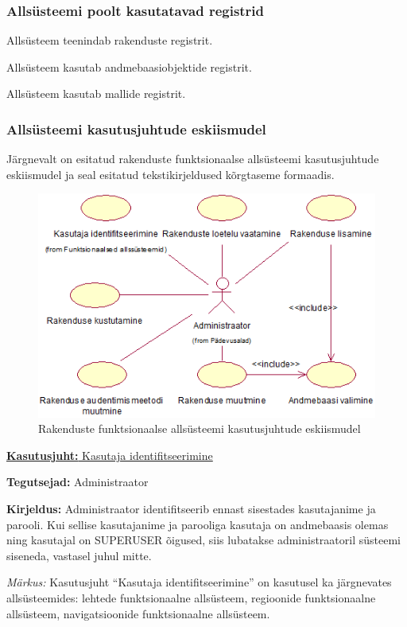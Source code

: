 \documentclass[a4paper,12pt]{article} %
\begin{document}
\subsubsection{Allsüsteemi poolt kasutatavad registrid}
Allsüsteem teenindab rakenduste registrit.\par
Allsüsteem kasutab andmebaasiobjektide registrit.\par
Allsüsteem kasutab mallide registrit.
\subsubsection{Allsüsteemi kasutusjuhtude eskiismudel}
Järgnevalt on esitatud rakenduste funktsionaalse allsüsteemi kasutusjuhtude eskiismudel ja seal esitatud tekstikirjeldused kõrgtaseme formaadis.
\begin{figure}[H]
\begin{center}
\includegraphics[bb=0 0 475 315,scale=1]{./diagrams/applications-subsystem-use-case-digram.png}
\caption{Rakenduste funktsionaalse allsüsteemi kasutusjuhtude eskiismudel}
\end{center}
\end{figure}
\underline{\textbf{Kasutusjuht:} Kasutaja identifitseerimine}
\par
\textbf{Tegutsejad:} Administraator
\par
\textbf{Kirjeldus:} Administraator identifitseerib ennast sisestades kasutajanime ja parooli. Kui sellise kasutajanime ja parooliga kasutaja on andmebaasis olemas ning kasutajal on SUPERUSER õigused, siis lubatakse administraatoril süsteemi siseneda, vastasel juhul mitte.
\par
\textit{Märkus:} Kasutusjuht  ``Kasutaja identifitseerimine'' on kasutusel ka järgnevates allsüsteemides: lehtede funktsionaalne allsüsteem, regioonide funktsionaalne allsüsteem, navigatsioonide funktsionaalne allsüsteem.\par
\end{document}
